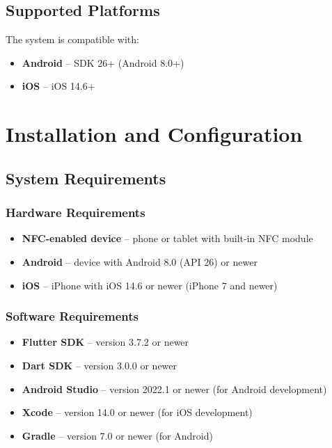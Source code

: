 \documentclass[a4paper,12pt]{article}
\begin{document}
\subsection{Supported Platforms}
The system is compatible with:
\begin{itemize}
    \item \textbf{Android} -- SDK 26+ (Android 8.0+)
    \item \textbf{iOS} -- iOS 14.6+
\end{itemize}

\newpage

\section{Installation and Configuration}

\subsection{System Requirements}

\subsubsection{Hardware Requirements}
\begin{itemize}
    \item \textbf{NFC-enabled device} -- phone or tablet with built-in NFC module
    \item \textbf{Android} -- device with Android 8.0 (API 26) or newer
    \item \textbf{iOS} -- iPhone with iOS 14.6 or newer (iPhone 7 and newer)
\end{itemize}

\subsubsection{Software Requirements}
\begin{itemize}
    \item \textbf{Flutter SDK} -- version 3.7.2 or newer
    \item \textbf{Dart SDK} -- version 3.0.0 or newer
    \item \textbf{Android Studio} -- version 2022.1 or newer (for Android development)
    \item \textbf{Xcode} -- version 14.0 or newer (for iOS development)
    \item \textbf{Gradle} -- version 7.0 or newer (for Android)
\end{itemize}
\end{document}
